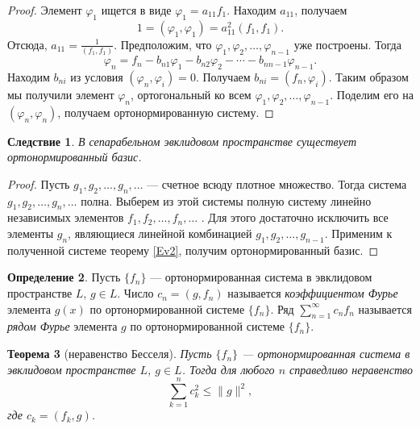 \documentclass[12pt, titlepage, oneside]{amsbook}
\newtheorem{theorem}{Теорема}[chapter]
\newtheorem{corollary}[theorem]{Следствие}
\theoremstyle{definition}
\newtheorem{definition}[theorem]{Определение}
\theoremstyle{remark}
\begin{document}
\begin{proof}
	Элемент $\varphi_1$ ищется в виде $\varphi_1=a_{11} f_1$. Находим $a_{11}$, получаем $$1=(\varphi_1,\varphi_1)=a_{11}^2(f_1,f_1).$$ Отсюда, $a_{11}=\frac{1}{(f_1,f_1)}$. Предположим, что $\varphi_1, \varphi_2,\ldots, \varphi_{n-1}$ уже построены. Тогда $$\varphi_n=f_n-b_{n1}\varphi_1-b_{n2}\varphi_2-\cdots-b_{n n-1}\varphi_{n-1}.$$ Находим $b_{ni}$ из условия $(\varphi_n,\varphi_i)=0$. Получаем $b_{ni}=(f_n,\varphi_i)$. Таким образом мы получили элемент $\varphi_n$, ортогональный ко всем $\varphi_1, \varphi_2,\ldots, \varphi_{n-1}$. Поделим его на $(\varphi_n,\varphi_n)$, получаем ортонормированную систему.
\end{proof}

\begin{corollary}
	\label{Ev3}
	В сепарабельном эвклидовом пространстве существует ортонормированный базис.
\end{corollary}

\begin{proof}
	Пусть $g_1,g_2,\ldots, g_n,\ldots$ --- счетное всюду плотное множество. Тогда система $g_1,g_2,\ldots, g_n,\ldots$ полна. Выберем из этой системы полную систему линейно независимых элементов $f_1,f_2,\ldots, f_n,\ldots$ . Для этого достаточно исключить все элементы $g_n$, являющиеся линейной комбинацией $g_1,g_2,\ldots, g_{n-1}$. Применим к полученной системе теорему \ref{Ev2}, получим ортонормированный базис.
\end{proof}


\begin{definition}
	Пусть $\{f_n\}$ --- ортонормированная система в эвклидовом пространстве $L$, $g\in L$. Число $c_n=(g,f_n)$ называется \emph{коэффициентом Фурье} элемента $g(x)$ по ортонормированной системе $\{f_n\}$. Ряд $\sum\limits_{n=1}^{\infty} c_n f_n$ называется \emph{рядом Фурье} элемента $g$ по ортонормированной системе $\{f_n\}$.
\end{definition}


\begin{theorem}[неравенство Бесселя]
	\label{Bes}
	Пусть $\{f_n\}$ --- ортонормированная система в эвклидовом пространстве $L$, $g\in L$. Тогда для любого $n$ справедливо неравенство $$\sum\limits_{k=1}^n c_k^2\leq \|g\|^2,$$ где $c_k=(f_k,g)$.
\end{theorem}
\end{document}
